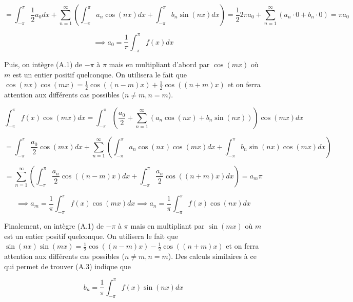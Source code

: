 \begin{equation*}
    = \int_{-\pi}^{\pi}\frac{1}{2} a_0 dx + \sum_{n=1}^{\infty} \left(\int_{-\pi}^{\pi} a_n \cos(nx) dx + \int_{-\pi}^{\pi} b_n \sin(nx) dx \right) = \frac{1}{2} 2\pi a_0 + \sum_{n=1}^{\infty} (a_n \cdot 0 + b_n \cdot 0) = \pi a_0
\end{equation*}

\begin{equation}
    \implies a_0 = \frac{1}{\pi} \int_{-\pi}^{\pi} f(x) dx
\end{equation}

Puis, on intègre (A.1) de $-\pi$ à $\pi$ mais en multipliant d'abord par $\cos(mx)$ où $m$ est un entier positif quelconque. On utilisera le fait que $\cos(nx)\cos(mx) = \frac{1}{2}\cos((n-m)x) + \frac{1}{2}\cos((n+m)x)$ et on ferra attention aux différents cas possibles ($n\neq m , n = m$).

\begin{equation*}
    \int_{-\pi}^{\pi} f(x)\cos(mx) dx = \int_{-\pi}^{\pi} \left(\frac{a_0}{2} + \sum_{n=1}^{\infty} (a_n \cos(nx) + b_n \sin(nx))\right) \cos(mx) dx
\end{equation*}

\begin{equation*}
    = \int_{-\pi}^{\pi} \frac{a_0}{2} \cos(mx) dx + \sum_{n=1}^{\infty} \left(\int_{-\pi}^{\pi} a_n\cos(nx)\cos(mx)dx + \int_{-\pi}^{\pi} b_n\sin(nx)\cos(mx)dx\right)
\end{equation*}

\begin{equation*}
    = \sum_{n=1}^{\infty} \left(\int_{-\pi}^{\pi}\frac{a_n}{2}\cos((n-m)x)dx + \int_{-\pi}^{\pi}\frac{a_n}{2}\cos((n+m)x)dx\right) = a_m \pi
\end{equation*}

\begin{equation}
    \implies a_m = \frac{1}{\pi}\int_{-\pi}^{\pi}f(x)\cos(mx)dx \implies a_n = \frac{1}{\pi}\int_{-\pi}^{\pi}f(x)\cos(nx)dx
\end{equation}

Finalement, on intègre (A.1) de $-\pi$ à $\pi$ mais en multipliant par $\sin(mx)$ où $m$ est un entier positif quelconque. On utilisera le fait que $\sin(nx)\sin(mx) = \frac{1}{2}\cos((n-m)x) - \frac{1}{2}\cos((n+m)x)$ et on ferra attention aux différents cas possibles ($n\neq m, n = m$). Des calculs similaires à ce qui permet de trouver (A.3) indique que 

\begin{equation}
    b_n = \frac{1}{\pi}\int_{-\pi}^{\pi}f(x)\sin(nx) dx
\end{equation}

